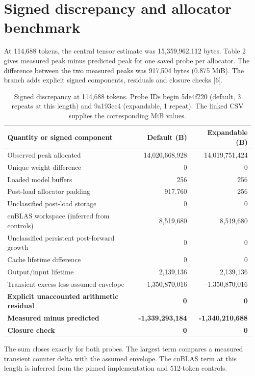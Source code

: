 \documentclass[11pt,a4paper]{article}
\begin{document}
\section{Signed discrepancy and allocator benchmark}
At 114,688 tokens, the central tensor estimate was 15,359,962,112 bytes. Table 2 gives measured peak minus predicted peak for one saved probe per allocator. The difference between the two measured peaks was 917,504 bytes (0.875 MiB). The branch adds explicit signed components, residuals and closure checks [6].

\begin{table}[htbp]
\centering
\small
\caption{Signed discrepancy at 114,688 tokens. Probe IDs begin 5de4f220 (default, 3 repeats at this length) and 9a193cc4 (expandable, 1 repeat). The linked CSV supplies the corresponding MiB values.}
\begin{tabular}{lrr}
\toprule
\textbf{Quantity or signed component} & \textbf{Default (B)} & \textbf{Expandable (B)} \\
\midrule
Observed peak allocated & 14,020,668,928 & 14,019,751,424 \\
Unique weight difference & 0 & 0 \\
Loaded model buffers & 256 & 256 \\
Post-load allocator padding & 917,760 & 256 \\
Unclassified post-load storage & 0 & 0 \\
cuBLAS workspace (inferred from controls) & 8,519,680 & 8,519,680 \\
Unclassified persistent post-forward growth & 0 & 0 \\
Cache lifetime difference & 0 & 0 \\
Output/input lifetime & 2,139,136 & 2,139,136 \\
Transient excess less assumed envelope & -1,350,870,016 & -1,350,870,016 \\
\midrule
\textbf{Explicit unaccounted arithmetic residual} & \textbf{0} & \textbf{0} \\
\textbf{Measured minus predicted} & \textbf{-1,339,293,184} & \textbf{-1,340,210,688} \\
\textbf{Closure check} & \textbf{0} & \textbf{0} \\
\bottomrule
\end{tabular}
\end{table}

The sum closes exactly for both probes. The largest term compares a measured transient counter delta with the assumed envelope. The cuBLAS term at this length is inferred from the pinned implementation and 512-token controls.
\end{document}
